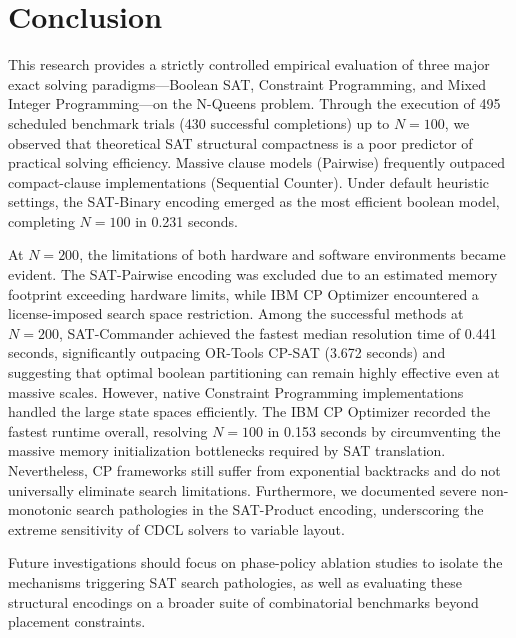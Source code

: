 \section{Conclusion}
\label{sec:conclusion}

This research provides a strictly controlled empirical evaluation of three major exact solving paradigms---Boolean SAT, Constraint Programming, and Mixed Integer Programming---on the N-Queens problem. Through the execution of 495 scheduled benchmark trials (430 successful completions) up to $N=100$, we observed that theoretical SAT structural compactness is a poor predictor of practical solving efficiency. Massive clause models (Pairwise) frequently outpaced compact-clause implementations (Sequential Counter). Under default heuristic settings, the SAT-Binary encoding emerged as the most efficient boolean model, completing $N=100$ in 0.231 seconds.

At $N=200$, the limitations of both hardware and software environments became evident. The SAT-Pairwise encoding was excluded due to an estimated memory footprint exceeding hardware limits, while IBM CP Optimizer encountered a license-imposed search space restriction. Among the successful methods at $N=200$, SAT-Commander achieved the fastest median resolution time of 0.441 seconds, significantly outpacing OR-Tools CP-SAT (3.672 seconds) and suggesting that optimal boolean partitioning can remain highly effective even at massive scales.
However, native Constraint Programming implementations handled the large state spaces efficiently. The IBM CP Optimizer recorded the fastest runtime overall, resolving $N=100$ in 0.153 seconds by circumventing the massive memory initialization bottlenecks required by SAT translation. Nevertheless, CP frameworks still suffer from exponential backtracks and do not universally eliminate search limitations. Furthermore, we documented severe non-monotonic search pathologies in the SAT-Product encoding, underscoring the extreme sensitivity of CDCL solvers to variable layout. 

Future investigations should focus on phase-policy ablation studies to isolate the mechanisms triggering SAT search pathologies, as well as evaluating these structural encodings on a broader suite of combinatorial benchmarks beyond placement constraints.
